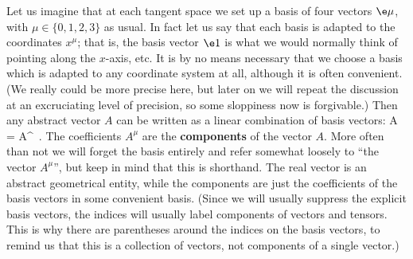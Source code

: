\documentclass[12pt]{article}
\begin{document}
Let us imagine that at each tangent space we set up a basis of four
vectors $\e\mu$, with $\mu\in\{0,1,2,3\}$ as usual.  In fact let us
say that each basis is adapted to the coordinates $x^\mu$; that is, the
basis vector $\e1$ is what we would normally think of pointing along
the $x$-axis, etc.  It is by no means necessary that we choose a basis
which is adapted to any coordinate system at all, although it is often
convenient.  (We really could be more precise here, but later
on we will repeat the discussion at an excruciating level of precision,
so some sloppiness now is forgivable.)  Then any abstract vector
$A$ can be written as a linear combination of basis vectors:
\be
  A = A^\mu \e\mu\ .\label{1.23}
\ee
The coefficients $A^\mu$ are the {\bf components} of the vector $A$.
More often than not we will forget the basis entirely and refer somewhat
loosely to ``the vector $A^\mu$'', but keep in mind that this is 
shorthand.  The real vector is an abstract geometrical entity, while the
components are just the coefficients of the basis vectors in some 
convenient basis.  (Since we will usually suppress the explicit basis
vectors, the indices will usually label components of vectors and 
tensors.  This is why there are parentheses around the indices on the
basis vectors, to remind us that this is a collection of vectors, not
components of a single vector.)
\end{document}
